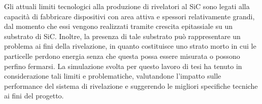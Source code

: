 Gli attuali limiti tecnologici alla produzione di rivelatori al SiC sono legati alla capacità di fabbricare dispositivi con area attiva e spessori relativamente grandi, dal momento che essi vengono realizzati tramite crescita epitassiale su un substrato di SiC.
Inoltre, la presenza di tale substrato può rappresentare un problema ai fini della rivelazione, in quanto costituisce uno strato morto in cui le particelle perdono energia senza che questa possa essere misurata o possono perfino fermarsi.
La simulazione svolta per questo lavoro di tesi ha tenuto in considerazione tali limiti e problematiche, valutandone l'impatto sulle performance del sistema di rivelazione e suggerendo le migliori specifiche tecniche ai fini del progetto. 












\vspace{0.5 cm}

\subsection{}





